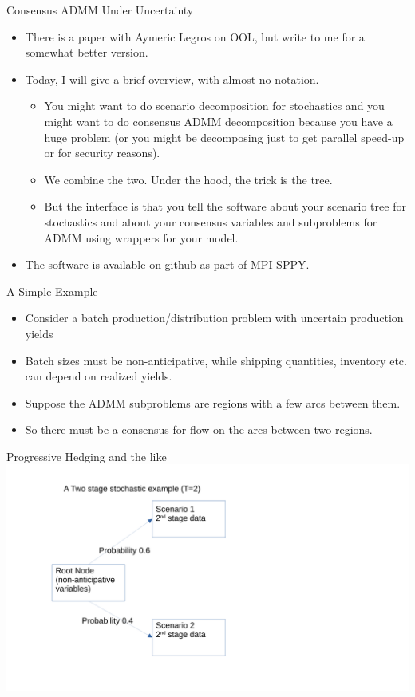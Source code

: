 \documentclass[9pt,usenames,dvipsnames]{beamer}
\begin{document}
\begin{frame}{Consensus ADMM Under Uncertainty}
  \begin{itemize}
  \item There is a paper with Aymeric Legros on OOL, but write to me for a somewhat better version.
  \item Today, I will give a brief overview, with almost no notation.
    \begin{itemize}
    \item You might want to do scenario decomposition for stochastics and you might want to do consensus ADMM decomposition because you have a huge problem (or you might be decomposing just to get parallel speed-up or for security reasons).
    \item We combine the two. Under the hood, the trick is the tree.
      \item But the interface is that you tell the software about your scenario tree for stochastics and about your consensus variables and subproblems for ADMM using wrappers for your model.
      \end{itemize}
    \item The software is available on github as part of MPI-SPPY.
  \end{itemize}
\end{frame}

\begin{frame}{A Simple Example}
  \begin{itemize}
  \item Consider a batch production/distribution problem with uncertain production yields
  \item Batch sizes must be non-anticipative, while shipping quantities, inventory etc. can depend on realized yields.
  \item Suppose the ADMM subproblems are regions with a few arcs between them.
    \item So there must be a consensus for flow on the arcs between two regions.
  \end{itemize}


\end{frame}

\begin{frame}{Progressive Hedging and the like}
\centering
 \includegraphics[width=1.1\linewidth]{tree1.pdf}
\end{frame}
\end{document}
